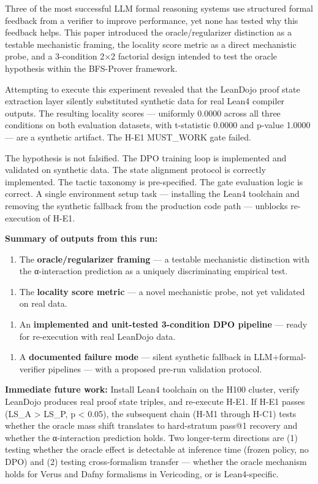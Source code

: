 
Three of the most successful LLM formal reasoning systems use structured formal feedback from a verifier to improve performance, yet none has tested why this feedback helps. This paper introduced the oracle/regularizer distinction as a testable mechanistic framing, the locality score metric as a direct mechanistic probe, and a 3-condition 2×2 factorial design intended to test the oracle hypothesis within the BFS-Prover framework.

Attempting to execute this experiment revealed that the LeanDojo proof state extraction layer silently substituted synthetic data for real Lean4 compiler outputs. The resulting locality scores — uniformly 0.0000 across all three conditions on both evaluation datasets, with t-statistic 0.0000 and p-value 1.0000 — are a synthetic artifact. The H-E1 MUST_WORK gate failed.

The hypothesis is not falsified. The DPO training loop is implemented and validated on synthetic data. The state alignment protocol is correctly implemented. The tactic taxonomy is pre-specified. The gate evaluation logic is correct. A single environment setup task — installing the Lean4 toolchain and removing the synthetic fallback from the production code path — unblocks re-execution of H-E1.

\textbf{Summary of outputs from this run:}

\begin{enumerate}
\item The \textbf{oracle/regularizer framing} — a testable mechanistic distinction with the α-interaction prediction as a uniquely discriminating empirical test.
\end{enumerate}

\begin{enumerate}
\item The \textbf{locality score metric} — a novel mechanistic probe, not yet validated on real data.
\end{enumerate}

\begin{enumerate}
\item An \textbf{implemented and unit-tested 3-condition DPO pipeline} — ready for re-execution with real LeanDojo data.
\end{enumerate}

\begin{enumerate}
\item A \textbf{documented failure mode} — silent synthetic fallback in LLM+formal-verifier pipelines — with a proposed pre-run validation protocol.
\end{enumerate}

\textbf{Immediate future work:} Install Lean4 toolchain on the H100 cluster, verify LeanDojo produces real proof state triples, and re-execute H-E1. If H-E1 passes (LS_A > LS_P, p < 0.05), the subsequent chain (H-M1 through H-C1) tests whether the oracle mass shift translates to hard-stratum pass@1 recovery and whether the α-interaction prediction holds. Two longer-term directions are (1) testing whether the oracle effect is detectable at inference time (frozen policy, no DPO) and (2) testing cross-formalism transfer — whether the oracle mechanism holds for Verus and Dafny formalisms in Vericoding, or is Lean4-specific.
